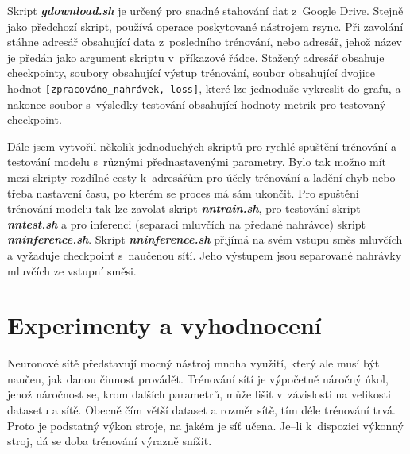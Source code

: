 Skript \textbf{\textit{gdownload.sh}} je určený pro snadné stahování dat z~Google Drive. Stejně jako předchozí skript, používá operace poskytované nástrojem rsync. Při zavolání stáhne adresář obsahující data z~posledního trénování, nebo adresář, jehož název je předán jako argument skriptu v~příkazové řádce.   
Stažený adresář obsahuje checkpointy, soubory obsahující výstup trénování, soubor obsahující dvojice hodnot \texttt{[zpracováno\_nahrávek, loss]}, které lze jednoduše vykreslit do grafu, a nakonec soubor s~výsledky testování obsahující hodnoty metrik pro testovaný checkpoint.

Dále jsem vytvořil několik jednoduchých skriptů pro rychlé spuštění trénování a testování modelu s~různými přednastavenými parametry. Bylo tak možno mít mezi skripty rozdílné cesty k~adresářům pro účely trénování a ladění chyb nebo třeba nastavení času, po kterém se proces má sám ukončit. Pro spuštění trénování modelu tak lze zavolat skript \textbf{\textit{nntrain.sh}}, pro testování skript \textbf{\textit{nntest.sh}} a pro inferenci (separaci mluvčích na předané nahrávce) skript \textbf{\textit{nninference.sh}}. Skript \textbf{\textit{nninference.sh}} přijímá na svém vstupu směs mluvčích a vyžaduje checkpoint s~naučenou sítí. Jeho výstupem jsou separované nahrávky mluvčích ze vstupní směsi.


\bigskip






\chapter{Experimenty a vyhodnocení}
\label{experimenty}
Neuronové sítě představují mocný nástroj mnoha využití, který ale musí být naučen, jak danou činnost provádět. Trénování sítí je výpočetně náročný úkol, jehož náročnost se, krom dalších parametrů, může lišit v~závislosti na velikosti datasetu a sítě. Obecně čím větší dataset a rozměr sítě, tím déle trénování trvá. Proto je podstatný výkon stroje, na jakém je síť učena. Je--li k~dispozici výkonný stroj, dá se doba trénování výrazně snížit.

